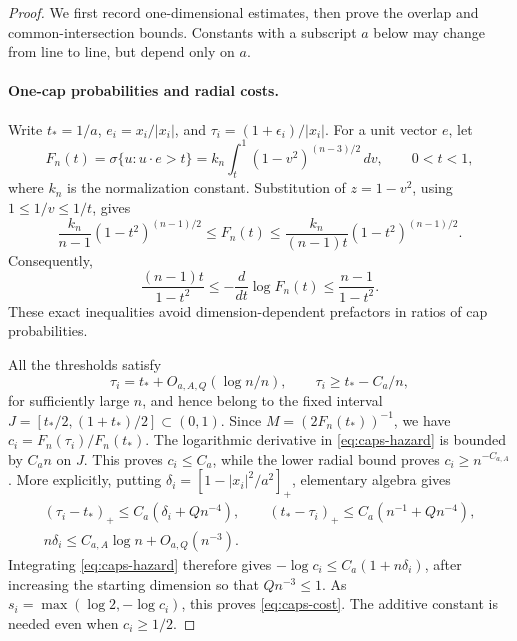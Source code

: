 \begin{proof}
We first record one-dimensional estimates, then prove the overlap and
common-intersection bounds. Constants with a subscript \(a\) below may
change from line to line, but depend only on \(a\).

\paragraph{One-cap probabilities and radial costs.}
Write \(t_*=1/a\), \(e_i=x_i/|x_i|\), and
\(\tau_i=(1+\epsilon_i)/|x_i|\). For a unit vector \(e\), let
\[
 F_n(t)=\sigma\{u:u\cdot e>t\}
 =k_n\int_t^1(1-v^2)^{(n-3)/2}\,dv,\qquad 0<t<1,
\]
where \(k_n\) is the normalization constant. Substitution of
\(z=1-v^2\), using \(1\le1/v\le1/t\), gives
\begin{equation}
 \frac{k_n}{n-1}(1-t^2)^{(n-1)/2}
 \le F_n(t)\le
 \frac{k_n}{(n-1)t}(1-t^2)^{(n-1)/2}.
 \label{eq:caps-mills}
\end{equation}
Consequently,
\begin{equation}
 \frac{(n-1)t}{1-t^2}
 \le-\frac{d}{dt}\log F_n(t)
 \le\frac{n-1}{1-t^2}.
 \label{eq:caps-hazard}
\end{equation}
These exact inequalities avoid dimension-dependent prefactors in
ratios of cap probabilities.

All the thresholds satisfy
\begin{equation}
 \tau_i=t_*+O_{a,A,Q}(\log n/n),\qquad
 \tau_i\ge t_*-C_a/n,
 \label{eq:caps-thresholds}
\end{equation}
for sufficiently large \(n\), and hence belong to the fixed interval
\(J=[t_*/2,(1+t_*)/2]\subset(0,1)\).
Since \(M=(2F_n(t_*))^{-1}\), we have
\(c_i=F_n(\tau_i)/F_n(t_*)\).
The logarithmic derivative in \eqref{eq:caps-hazard} is bounded by
\(C_an\) on \(J\). This proves \(c_i\le C_a\), while the lower radial
bound proves \(c_i\ge n^{-C_{a,A}}\).
More explicitly, putting \(\delta_i=[1-|x_i|^2/a^2]_+\), elementary
algebra gives
\[
\begin{gathered}
 (\tau_i-t_*)_+\le C_a(\delta_i+Qn^{-4}),\qquad
 (t_*-\tau_i)_+\le C_a(n^{-1}+Qn^{-4}),\\
 n\delta_i\le C_{a,A}\log n+O_{a,Q}(n^{-3}).
\end{gathered}
\]
Integrating \eqref{eq:caps-hazard} therefore gives
\(-\log c_i\le C_a(1+n\delta_i)\), after increasing the starting
dimension so that \(Qn^{-3}\le1\). As
\(s_i=\max(\log2,-\log c_i)\), this proves
\eqref{eq:caps-cost}. The additive constant is needed even when
\(c_i\ge1/2\).


\end{proof}
